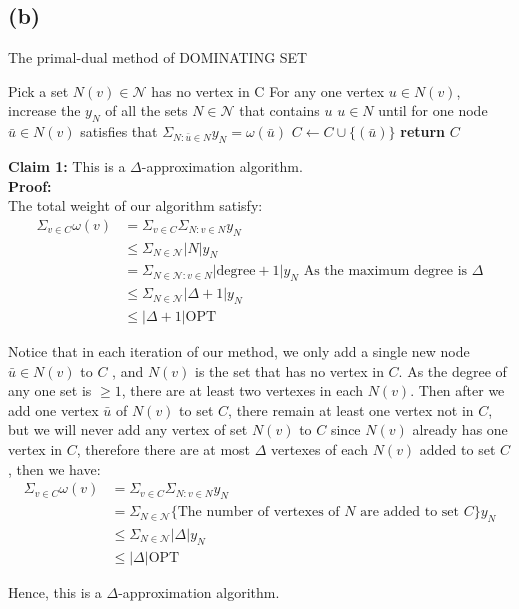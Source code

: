 \documentclass[a4paper,12pt]{article}
\def\N{{\mathcal{N}}}
\begin{document}
\subsection*{(b)}          
 
\begin{algorithm}
\caption{The primal-dual method of DOMINATING SET } 
\begin{algorithmic} 
\State Pick a set $N(v) \in \N$ has no vertex in C 
\State For any one vertex $u \in N(v)$, increase the $y_N $ of all the sets $N \in \N$ that contains $u$ $u \in N $ 
\State until for one node $ \bar{u} \in N(v)$ satisfies that $\Sigma_{N : \bar{u} \in N } y_{N } = \omega (\bar{u})$ 
\State  $C \gets C \cup \{( \bar{u})\}$ 
\EndWhile 
\State \textbf{return} $C$ 
\end{algorithmic}
\end{algorithm}

\noindent \textbf{Claim 1:} This is a $\Delta$-approximation algorithm.\\
 
\textbf{Proof:}\\
The total weight of our algorithm satisfy:
\begin{align}\label{cost}
\Sigma_{v \in C} \omega(v) & =\Sigma_{v \in C} \Sigma_{N : v \in N } y_{N}\\
& \leq \Sigma_{N \in \N } |N | y_{N }\\ \label{size_N}
& = \Sigma_{N \in \N: v \in N } |\text{degree} + 1| y_{N }\text{  As the maximum degree is $\Delta$}\\
& \leq \Sigma_{N  \in \N } |\Delta + 1| y_{N } \\
& \leq |\Delta + 1| \text{OPT}
\end{align}

Notice that in each iteration of our method, we only add a single new node $\bar{u} \in N(v) $ to $C$ , and $N(v)$ is the set that has no vertex in $C$. As the degree of any one set is $ \geq 1$, there are at least two vertexes in each $N(v)$. Then after we add one vertex $\bar{u}$ of $N(v)$ to set $C$, there remain at least one vertex not in $C$, but we will never add any vertex of set $N(v)$ to $C$ since $N(v)$ already has one vertex in $C$, therefore there are at most $\Delta$ vertexes of each $N(v)$ added to set $C$, then we have:\\
\begin{align} 
\Sigma_{v \in C} \omega(v) & =\Sigma_{v \in C} \Sigma_{N : v \in N } y_{N}\\
 & = \Sigma_{N  \in \N } \text{\{The number of vertexes of $N$ are added to set $C$\} } y_{N }\\  
 & \leq \Sigma_{N \in \N}  |\Delta  | y_{N } \\
& \leq |\Delta  | \text{OPT} 
\end{align}
 
Hence, this is a $\Delta$-approximation algorithm. 
\end{document}
